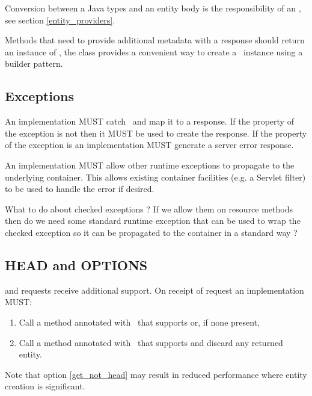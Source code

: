 Conversion between a Java types and an entity body is the responsibility of an \EntityProvider, see section \ref{entity_providers}.

Methods that need to provide additional metadata with a response should return an instance of \Response, the \Response{} class provides a convenient way to create a \Response\ instance using a builder pattern.

\subsection{Exceptions}

An implementation MUST catch \WebAppExc\ and map it to a response. If the  property of the exception is not  then it MUST be used to create the response. If the  property of the exception is  an implementation MUST generate a server error response.

An implementation MUST allow other runtime exceptions to propagate to the underlying container. This allows existing container facilities (e.g. a Servlet filter) to be used to handle the error if desired.

\begin{ednote}What to do about checked exceptions ? If we allow them on resource methods then do we need some standard runtime exception that can be used to wrap the checked exception so it can be propagated to the container in a standard way ?\end{ednote}

\subsection{HEAD and OPTIONS}
\label{head_and_options}

 and  requests receive additional support. On receipt of  request an implementation MUST:

\begin{enumerate}
\item Call a method annotated with \HttpMethod\ that supports  or, if none present,
\item\label{get_not_head} Call a method annotated with \HttpMethod\ that supports  and discard any returned entity.
\end{enumerate}

Note that option \ref{get_not_head} may result in reduced performance where entity creation is significant.

